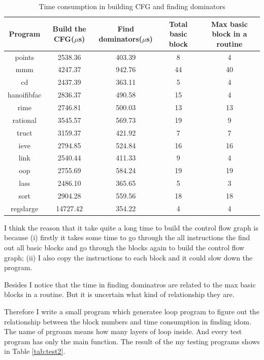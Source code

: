 \documentclass{llncs}
\begin{document}
\begin{table}[h]
\centering
\begin{tabular}{|c|c|c|c|c|}
\hline
Program & Build the CFG($\mu$s) & Find dominators($\mu$s) & Total basic block & Max basic block in a routine \\\hline
points & 2538.36 & 403.39 & 8 & 4
\\\hline
mmm & 4247.37 & 942.76 & 44 & 40
\\\hline
cd & 2437.39 & 363.11 & 5 & 4
\\\hline
hanoifibfac & 2836.37 & 490.58 & 15 & 4
\\\hline
rime & 2746.81 & 500.03 & 13 & 13
\\\hline
rational & 3545.57 & 569.73 & 19 & 9
\\\hline
truct & 3159.37 & 421.92 & 7 & 7
\\\hline
ieve & 2794.85 & 524.84 & 16 & 16
\\\hline
link & 2540.44 & 411.33 & 9 & 4
\\\hline
oop & 2755.69 & 584.24 & 19 & 19
\\\hline
lass & 2486.10 & 365.65 & 5 & 3
\\\hline
sort & 2904.28 & 559.56 & 18 & 18
\\\hline
regslarge & 14727.42 & 354.22 & 4 & 4
\\\hline
\end{tabular}
\caption{Time consumption in building CFG and finding dominators}
\label{tab:test1}
\end{table}

I think the reason that it take quite a long time to build the control flow graph is because (i) firstly it takes some time to go through the all instructions the find out all basic blocks and go through the blocks again to build the control flow graph; (ii) I also copy the instructions to each block and it could slow down the program.

Besides I notice that the time in finding dominatros are related to the max basic blocks in a routine. But it is uncertain what kind of relationship they are. 

Therefore I write a small program which generatee loop program to figure out the relationship between the block numbers and time consumption in finding idom. The name of prgroam means how many layers of loop inside. And every test program has only the main function. The result of the my testing programs shows in Table \ref{tab:test2}.
\end{document}
